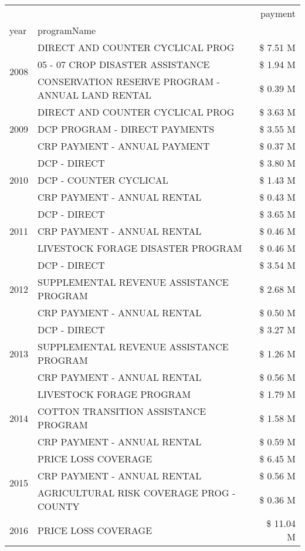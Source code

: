 \begin{tabular}{llr}
\toprule
 &  & payment \\
year & programName &  \\
\midrule
\multirow[t]{3}{*}{2008} & DIRECT AND COUNTER CYCLICAL PROG & \$ 7.51 M \\
 & 05 - 07 CROP DISASTER ASSISTANCE & \$ 1.94 M \\
 & CONSERVATION RESERVE PROGRAM - ANNUAL LAND RENTAL & \$ 0.39 M \\
\cline{1-3}
\multirow[t]{3}{*}{2009} & DIRECT AND COUNTER CYCLICAL PROG & \$ 3.63 M \\
 & DCP PROGRAM - DIRECT PAYMENTS & \$ 3.55 M \\
 & CRP PAYMENT - ANNUAL PAYMENT & \$ 0.37 M \\
\cline{1-3}
\multirow[t]{3}{*}{2010} & DCP - DIRECT & \$ 3.80 M \\
 & DCP - COUNTER CYCLICAL & \$ 1.43 M \\
 & CRP PAYMENT - ANNUAL RENTAL & \$ 0.43 M \\
\cline{1-3}
\multirow[t]{3}{*}{2011} & DCP - DIRECT & \$ 3.65 M \\
 & CRP PAYMENT - ANNUAL RENTAL & \$ 0.46 M \\
 & LIVESTOCK FORAGE DISASTER PROGRAM & \$ 0.46 M \\
\cline{1-3}
\multirow[t]{3}{*}{2012} & DCP - DIRECT & \$ 3.54 M \\
 & SUPPLEMENTAL REVENUE ASSISTANCE PROGRAM & \$ 2.68 M \\
 & CRP PAYMENT - ANNUAL RENTAL & \$ 0.50 M \\
\cline{1-3}
\multirow[t]{3}{*}{2013} & DCP - DIRECT & \$ 3.27 M \\
 & SUPPLEMENTAL REVENUE ASSISTANCE PROGRAM & \$ 1.26 M \\
 & CRP PAYMENT - ANNUAL RENTAL & \$ 0.56 M \\
\cline{1-3}
\multirow[t]{3}{*}{2014} & LIVESTOCK FORAGE PROGRAM & \$ 1.79 M \\
 & COTTON TRANSITION ASSISTANCE PROGRAM & \$ 1.58 M \\
 & CRP PAYMENT - ANNUAL RENTAL & \$ 0.59 M \\
\cline{1-3}
\multirow[t]{3}{*}{2015} & PRICE LOSS COVERAGE & \$ 6.45 M \\
 & CRP PAYMENT - ANNUAL RENTAL & \$ 0.56 M \\
 & AGRICULTURAL RISK COVERAGE PROG - COUNTY & \$ 0.36 M \\
\cline{1-3}
\multirow[t]{3}{*}{2016} & PRICE LOSS COVERAGE & \$ 11.04 M \\

\end{tabular}
